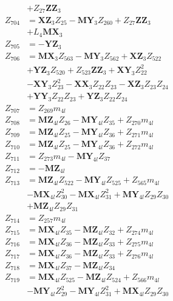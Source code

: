 \begin{multicols}{2}
\begin{align}
&+ Z_{27}\mathbf{ZZ}_3 \nonumber \\
Z_{704} &= \mathbf{XZ}_3Z_{25} - \mathbf{MY}_3Z_{260} + Z_{27}\mathbf{ZZ}_3  \nonumber \\
&+ L_4\mathbf{MX}_3 \nonumber \\
Z_{705} &= -\mathbf{YZ}_3 \nonumber \\
Z_{706} &= \mathbf{MX}_3Z_{563} - \mathbf{MY}_3Z_{562} + \mathbf{XZ}_3Z_{522}  \nonumber \\
&+ \mathbf{YZ}_3Z_{520} + Z_{523}\mathbf{ZZ}_3 + \mathbf{XY}_3Z_{22}^2  \nonumber \\
&- \mathbf{XY}_3Z_{23}^2 - \mathbf{XX}_3Z_{22}Z_{23} - \mathbf{XZ}_3Z_{23}Z_{24}  \nonumber \\
&+ \mathbf{YY}_3Z_{22}Z_{23} + \mathbf{YZ}_3Z_{22}Z_{24} \nonumber \\
Z_{707} &= Z_{269}m_{4l} \nonumber \\
Z_{708} &= \mathbf{MZ}_{4l}Z_{26} - \mathbf{MY}_{4l}Z_{35} + Z_{270}m_{4l} \nonumber \\
Z_{709} &= \mathbf{MZ}_{4l}Z_{25} - \mathbf{MY}_{4l}Z_{36} + Z_{271}m_{4l} \nonumber \\
Z_{710} &= \mathbf{MZ}_{4l}Z_{25} - \mathbf{MY}_{4l}Z_{36} + Z_{272}m_{4l} \nonumber \\
Z_{711} &= Z_{273}m_{4l} - \mathbf{MY}_{4l}Z_{37} \nonumber \\
Z_{712} &= -\mathbf{MZ}_{4l} \nonumber \\
Z_{713} &= \mathbf{MZ}_{4l}Z_{522} - \mathbf{MY}_{4l}Z_{525} + Z_{565}m_{4l}  \nonumber \\
&- \mathbf{MX}_{4l}Z_{30}^2 - \mathbf{MX}_{4l}Z_{31}^2 + \mathbf{MY}_{4l}Z_{29}Z_{30}  \nonumber \\
&+ \mathbf{MZ}_{4l}Z_{29}Z_{31} \nonumber \\
Z_{714} &= Z_{257}m_{4l} \nonumber \\
Z_{715} &= \mathbf{MX}_{4l}Z_{35} - \mathbf{MZ}_{4l}Z_{32} + Z_{274}m_{4l} \nonumber \\
Z_{716} &= \mathbf{MX}_{4l}Z_{36} - \mathbf{MZ}_{4l}Z_{33} + Z_{275}m_{4l} \nonumber \\
Z_{717} &= \mathbf{MX}_{4l}Z_{36} - \mathbf{MZ}_{4l}Z_{33} + Z_{276}m_{4l} \nonumber \\
Z_{718} &= \mathbf{MX}_{4l}Z_{37} - \mathbf{MZ}_{4l}Z_{34} \nonumber \\
Z_{719} &= \mathbf{MX}_{4l}Z_{525} - \mathbf{MZ}_{4l}Z_{524} + Z_{566}m_{4l}  \nonumber \\
&- \mathbf{MY}_{4l}Z_{29}^2 - \mathbf{MY}_{4l}Z_{31}^2 + \mathbf{MX}_{4l}Z_{29}Z_{30}  \nonumber \\

\end{align}
\end{multicols}
